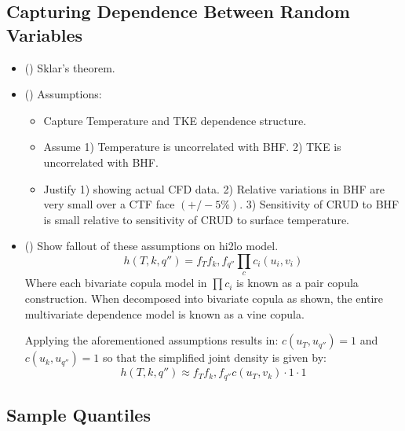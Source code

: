 \subsection{Capturing Dependence Between Random Variables}
\begin{itemize}
	\item (\checkmark) Sklar's theorem.
	\item (\checkmark) Assumptions: 
	\begin{itemize}
		\item Capture Temperature and TKE dependence structure.
		\item Assume 1) Temperature is uncorrelated with BHF.  2) TKE is uncorrelated with BHF.
		\item Justify 1) showing actual CFD data. 2) Relative variations in BHF are very small over a CTF face $(+/- 5\%)$.  3) Sensitivity of CRUD to BHF is small relative to sensitivity of CRUD to surface temperature.
	\end{itemize}
	\item (\checkmark) Show fallout of these assumptions on hi2lo model.
	\begin{equation}
		h(T, k, q'') = f_T f_k, f_{q''} \prod_c c_i(u_i, v_i)
	\end{equation}
	Where each bivariate copula model in $\prod c_i $ is known as a pair copula construction.  When decomposed into bivariate copula as shown, the entire multivariate dependence model is known as a vine copula.
	
	Applying the aforementioned assumptions results in: $c(u_T, u_{q''}) = 1$ and $c(u_{k}, u_{q''}) = 1$ so that the simplified joint density is given by:
	\begin{equation}
		h(T, k, q'') \approx  f_T f_k, f_{q''} c(u_{T}, v_{k})  \cdot 1 \cdot 1
    \end{equation}	 
\end{itemize}


\subsection{Sample Quantiles}

